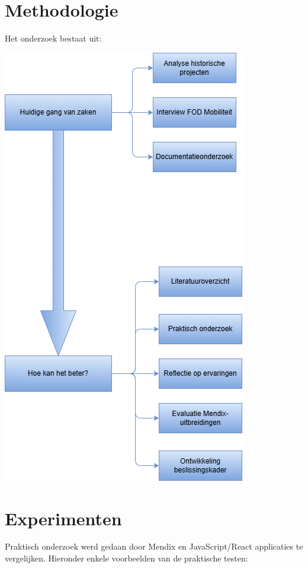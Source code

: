 \documentclass[a0,portrait]{hogent-poster}
\begin{document}
\begin{multicols}{2}
        \section{Methodologie}
        Het onderzoek bestaat uit:
        \begin{center}
            \begin{minipage}{1\linewidth}
                \centering
                \includegraphics[height=0.3\textheight, keepaspectratio]{Methodologie.png}
            \end{minipage}
        \end{center}

        
        \section{Experimenten}
        Praktisch onderzoek werd gedaan door Mendix en JavaScript/React applicaties te vergelijken. Hieronder enkele voorbeelden van de praktische testen:
        

\end{multicols}
\end{document}
